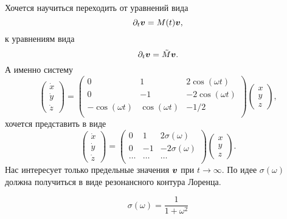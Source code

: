 Хочется научиться переходить от уравнений вида
\begin{equation*}
    \partial_t \mbox{\boldmath $v$} = M(t) \mbox{\boldmath $v$},
\end{equation*}
к уравнениям вида
\begin{equation*}
    \partial_t \mbox{\boldmath $v$} = \tilde{M} \mbox{\boldmath $v$}.
\end{equation*}
А именно систему
\begin{equation*}
    \begin{pmatrix}
        \dot{x} \\ \dot{y} \\ \dot{z}
    \end{pmatrix} = \begin{pmatrix}
        0 & 1 & 2 \cos(\omega t) \\
        0 & -1 & -2 \cos(\omega t) \\
        -\cos(\omega t) & \cos(\omega t) & -1/2 \\
    \end{pmatrix} \begin{pmatrix}
        x \\ y \\ z
    \end{pmatrix},
\end{equation*}
хочется представить в виде
\begin{equation*}
    \begin{pmatrix}
        \dot{x} \\ \dot{y} \\ \dot{z}
    \end{pmatrix} = \begin{pmatrix}
        0 & 1 & 2 \sigma(\omega) \\
        0 & -1 & -2 \sigma(\omega) \\
        \ldots & \ldots & \ldots \\
    \end{pmatrix} \begin{pmatrix}
        x \\ y \\ z
    \end{pmatrix}.
\end{equation*}
Нас интересует только предельные значения $\mbox{\boldmath $v$}$ при $t \to \infty$.
По идее $\sigma(\omega)$ должна получиться в виде резонансного контура Лоренца.

\begin{equation*}
    \sigma(\omega) = \frac{1}{1 + \omega^2}
\end{equation*}
